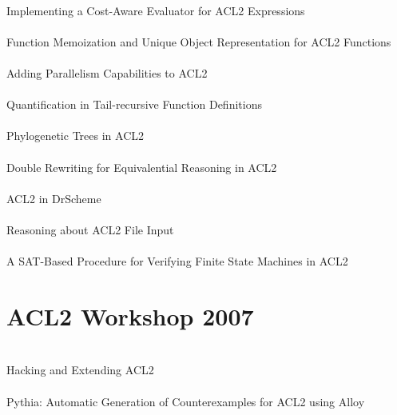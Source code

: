 \documentclass{article}
\begin{document}
\cite{06-gamboa-evaluator} \\
Implementing a Cost-Aware Evaluator for {ACL2} Expressions \\

\cite{06-boyer-memoization} \\
Function Memoization and Unique Object Representation for {ACL2} Functions \\

\cite{06-rager-parallelism} \\
Adding Parallelism Capabilities to {ACL2} \\

\cite{06-ray-quantification} \\
Quantification in Tail-recursive Function Definitions \\

\cite{06-hunt-phylogenetic} \\
Phylogenetic Trees in {ACL2} \\

\cite{06-kaufmann-double} \\
Double Rewriting for Equivalential Reasoning in {ACL2} \\

\cite{06-vaillancourt-drscheme} \\
{ACL2} in {DrScheme} \\

\cite{06-davis-file} \\
Reasoning about {ACL2} File Input \\

\cite{06-reeber-sat} \\
A {SAT}-Based Procedure for Verifying Finite State Machines in {ACL2} \\


\section{ACL2 Workshop 2007}

\cite{07-dillinger-hacking} \\
Hacking and Extending {ACL2} \\

\cite{07-spiridonov-pythia} \\
{Pythia:} Automatic Generation of Counterexamples for {ACL2} using {Alloy} \\
\end{document}
